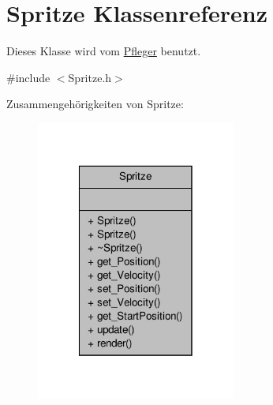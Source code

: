 \hypertarget{class_spritze}{\section{Spritze Klassenreferenz}
\label{class_spritze}
}


Dieses Klasse wird vom \hyperlink{class_pfleger}{Pfleger} benutzt.  




{\ttfamily \#include $<$Spritze.\-h$>$}



Zusammengehörigkeiten von Spritze\-:
\nopagebreak
\begin{figure}[H]
\begin{center}
\leavevmode
\includegraphics[width=186pt]{class_spritze__coll__graph}
\end{center}
\end{figure}
